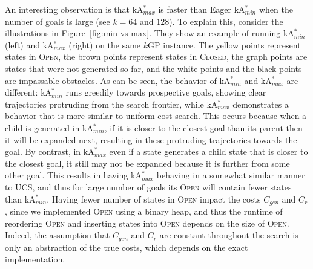 \documentclass{aicom2e}
\newcommand{\kgs}{$k$GP}
\newcommand{\kastar}{kA$^*$}
\newcommand{\kastarmin}{kA$^*_{min}$}
\newcommand{\kastarmax}{kA$^*_{max}$}
\newcommand{\open}{\textsc{Open}}
\newcommand{\closed}{\textsc{Closed}}
\newcommand{\roni}[1]{\textbf{[RS:#1]}}
\begin{document}
An interesting observation is that \kastarmax{} is faster than Eager \kastarmin{}
when the number of goals is large (see $k=64$ and $128$). To explain this, consider the illustrations in Figure~\ref{fig:min-vs-max}. They show an example of running \kastarmin{} (left) and \kastarmax{} (right) on the same \kgs{} instance. The yellow points represent states in \open{}, the brown points represent states in \closed{}, the graph points are states that were not generated so far, and the white points and the black points are impassable obstacles. As can be seen, the behavior of \kastarmin{} and \kastarmax{} are different: \kastarmin{} runs greedily towards prospective goals, showing clear trajectories protruding from the search frontier, while \kastarmax{} demonstrates a behavior that is more similar to uniform cost search. This occurs  because when a child is generated in \kastarmin{}, if it is closer to the closest goal than its parent then it will be expanded next, resulting in these protruding trajectories towards the goal. By contrast, in \kastarmax{} even if a state generates a child state that is closer to the closest goal, it still may not be expanded because it is further from some other goal. This results in having \kastarmax{} behaving in a somewhat similar manner to UCS, and thus for large number of goals its \open{} will contain fewer states than \kastarmin{}. 
Having fewer number of states in \open{} impact the costs $C_{gen}$ and $C_{r}$, 
since we implemented \open{} using a binary heap, and thus the runtime of reordering \open{} and inserting states into \open{} depends on the size of \open{}. Indeed, the assumption that $C_{gen}$ and $C_r$ are constant throughout the search is only an abstraction of the true costs, which depends on the exact implementation. 







\end{document}
